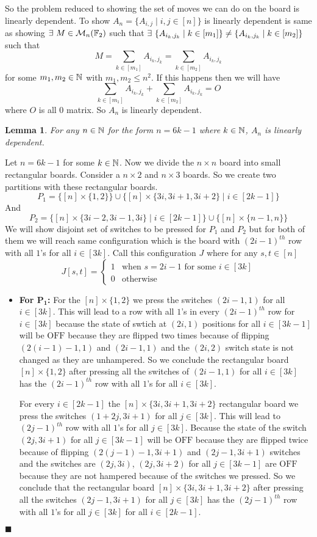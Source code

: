 \documentclass[a4paper, 11pt]{article}
\newtheorem{lemma}{Lemma}
\renewenvironment{proof}{\noindent{\it \textbf{Proof:}}\hspace*{1em}}{\hfill $\blacksquare$\bigskip\\}
\begin{document}
{So the problem reduced to showing the set of moves we can do on the board is linearly dependent. To show $A_n=\{A_{i,j}\mid i,j\in[n]\}$ is linearly dependent is same as showing $\exists \ M\in\mathcal{M}_n(\mathbb{F}_2)$ such that $\exs\ \{A_{i_k,j_k}\mid k\in [m_1]\}\neq \{A_{i_k,j_k}\mid k\in [m_2]\}$ such that $$M=\sum_{k\in [m_1]}A_{i_{k},j_{k}}=\sum_{k\in [m_2]}A_{i_{k},j_{k}}$$for some $m_1,m_2\in\mathbb{N}$ with $m_1,m_2\leq n^2$. If this happens then we will have $$\sum_{k\in [m_1]}A_{i_{k},j_{k}}+\sum_{k\in [m_2]}A_{i_{k},j_{k}}=O$$where $O$ is all $0$ matrix. So $A_n$ is linearly dependent. 
\begin{lemma}
	For any $n\in\mathbb{N}$ for the form $n=6k-1$ where $k\in\mathbb{N}$, $A_n$ is linearly dependent.
\end{lemma} 
\begin{proof}
	Let $n=6k-1$ for some $k\in\mathbb{N}$. Now we divide the $n\times n$ board into small rectangular boards. Consider a $n\times 2$ and $n\times 3$ boards. So we create two partitions with these rectangular boards.$$P_1=\Big\{[n]\times \{1,2\}\Big\}\cup \Big\{[n]\times \{3i,3i+1,3i+2\}\mid i\in[2k-1] \Big\}$$And  $$ P_2=\Big\{[n]\times \{3i-2,3i-1,3i\}\mid i\in[2k-1] \Big\}\cup \Big\{[n]\times \{n-1,n\}\Big\}$$We will show disjoint set of switches to be pressed for $P_1$ and $P_2$ but for both of them we will reach same configuration which is the board with $(2i-1)^{th}$ row with all $1$'s for all $i\in[3k]$. Call this configuration $J$ where for any $s,t\in[n]$ $$J[s,t]=\begin{cases}
		1& \text{when $s=2i-1$ for some $i\in[3k]$}\\
		0 & \text{otherwise}
	\end{cases}$$
	\begin{itemize}
		\item \textbf{For $\boldsymbol{P_1}$:} For the $[n]\times \{1,2\}$ we press the switches $(2i-1,1)$ for all $i\in[3k]$. This will lead to a row with all $1$'s in every $(2i-1)^{th}$ row for $i\in[3k]$ because the state of swtich at $(2i,1)$ positions for all $i\in[3k-1]$ will be $\mathrm{OFF}$ because they are flipped two times because of flipping $(2(i-1)-1,1)$ and $(2i-1,1)$ and the $(2i,2)$ switch state is not changed as they are unhampered.    So we conclude the rectangular board $[n]\times \{1,2\}$ after pressing all the switches of  $(2i-1,1)$ for all $i\in[3k]$ has the  $(2i-1)^{th}$ row with all $1$'s for all $i\in[3k]$. \parinn
		
		For every $i\in[2k-1]$ the $[n]\times \{3i,3i+1,3i+2\}$ rectangular board we press the switches $(1+2j,3i+1)$ for all $j\in[3k]$. This will lead to $({2j-1})^{th}$ row with all $1$'s for all $j\in[3k]$. Because the state of the switch $(2j,3i+1)$ for all $j\in[3k-1]$ will be $\mathrm{OFF}$ because they are flipped twice because of flipping $(2(j-1)-1,3i+1)$ and $(2j-1,3i+1)$ switches and the switches are $(2j,3i)$, $(2j,3i+2)$ for all $j\in[3k-1]$ are $\mathrm{OFF}$ because they are not hampered because of the switches we pressed. So we conclude that the rectangular board $[n]\times \{3i,3i+1,3i+2\}$ after pressing all the switches  $(2j-1,3i+1)$ for all $j\in[3k]$ has  the $({2j-1})^{th}$ row with all $1$'s for all $j\in[3k]$ for all $i\in[2k-1]$.
		

\end{itemize}
\end{proof}}
\end{document}
